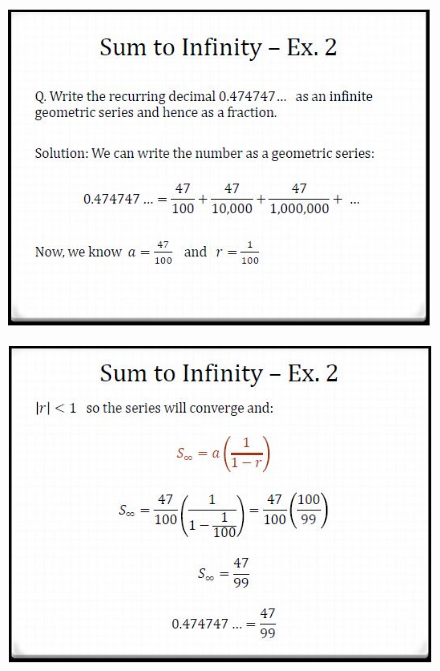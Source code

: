 \documentclass{beamer}
\begin{document}
\begin{frame}
	\begin{figure}
		\centering
		\includegraphics[width=0.99\linewidth]{SeqSer22A}
	\end{figure}
	
\end{frame}	
\begin{frame}
	\begin{figure}
		\centering
		\includegraphics[width=0.99\linewidth]{SeqSer22B}
	\end{figure}
	
\end{frame}
\end{document}
